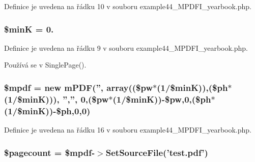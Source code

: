 Definice je uvedena na řádku 10 v souboru example44\-\_\-\-M\-P\-D\-F\-I\-\_\-yearbook.\-php.

\hypertarget{example44___m_p_d_f_i__yearbook_8php_a2cd7cb6f9b01bfb0427bd7c4930bf68e}{
\subsubsection[{\$min\-K}]{\setlength{\rightskip}{0pt plus 5cm}\$min\-K = 0.}}\label{example44___m_p_d_f_i__yearbook_8php_a2cd7cb6f9b01bfb0427bd7c4930bf68e}


Definice je uvedena na řádku 9 v souboru example44\-\_\-\-M\-P\-D\-F\-I\-\_\-yearbook.\-php.



Používá se v Single\-Page().

\hypertarget{example44___m_p_d_f_i__yearbook_8php_ad028f81910d6cbab9b184d2214b3a8f8}{
\subsubsection[{\$mpdf}]{\setlength{\rightskip}{0pt plus 5cm}\$mpdf = new {\bf m\-P\-D\-F}('', array((\$pw$\ast$(1/\$min\-K)),(\$ph$\ast$(1/\$min\-K))), '','', 0,(\$pw$\ast$(1/\$min\-K))-\/\$pw,0,(\$ph$\ast$(1/\$min\-K))-\/\$ph,0,0)}}\label{example44___m_p_d_f_i__yearbook_8php_ad028f81910d6cbab9b184d2214b3a8f8}


Definice je uvedena na řádku 16 v souboru example44\-\_\-\-M\-P\-D\-F\-I\-\_\-yearbook.\-php.

\hypertarget{example44___m_p_d_f_i__yearbook_8php_a905390c82ddf2d57cc0c524f4e5b0425}{
\subsubsection[{\$pagecount}]{\setlength{\rightskip}{0pt plus 5cm}\$pagecount = \$mpdf-\/$>$Set\-Source\-File('test.\-pdf')}}\label{example44___m_p_d_f_i__yearbook_8php_a905390c82ddf2d57cc0c524f4e5b0425}


